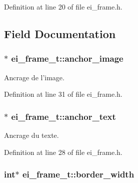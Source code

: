 Definition at line 20 of file ei\-\_\-frame.\-h.



\subsection{Field Documentation}
\hypertarget{structei__frame__t_a94e97ecc8308b6be2a610683d654fd62}{
\subsubsection[{anchor\-\_\-image}]{$\ast$ ei\-\_\-frame\-\_\-t\-::anchor\-\_\-image}}\label{structei__frame__t_a94e97ecc8308b6be2a610683d654fd62}


Ancrage de l'image. 



Definition at line 31 of file ei\-\_\-frame.\-h.

\hypertarget{structei__frame__t_a5ad39014014507f967ba5a38ef57fcbb}{
\subsubsection[{anchor\-\_\-text}]{$\ast$ ei\-\_\-frame\-\_\-t\-::anchor\-\_\-text}}\label{structei__frame__t_a5ad39014014507f967ba5a38ef57fcbb}


Ancrage du texte. 



Definition at line 28 of file ei\-\_\-frame.\-h.

\hypertarget{structei__frame__t_af9014a63bb45010387c762ac93bc0052}{
\subsubsection[{border\-\_\-width}]{\setlength{\rightskip}{0pt plus 5cm}int$\ast$ ei\-\_\-frame\-\_\-t\-::border\-\_\-width}}\label{structei__frame__t_af9014a63bb45010387c762ac93bc0052}


